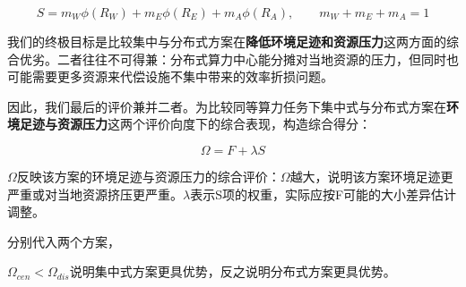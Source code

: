 \begin{equation}\label{eq:q2-sweighted}
S=m_W\phi(R_W)+m_E\phi(R_E)+m_A\phi(R_A), \qquad m_W+m_E+m_A=1
\end{equation}


我们的终极目标是比较集中与分布式方案在\textbf{降低环境足迹和资源压力}这两方面的综合优劣。二者往往不可得兼：分布式算力中心能分摊对当地资源的压力，但同时也可能需要更多资源来代偿设施不集中带来的效率折损问题。

因此，我们最后的评价兼并二者。为比较同等算力任务下集中式与分布式方案在\textbf{环境足迹与资源压力}这两个评价向度下的综合表现，构造综合得分：

\begin{equation}\label{eq:q2-final}
\Omega = F + \lambda S
\end{equation}

$\Omega$反映该方案的环境足迹与资源压力的综合评价：$\Omega$越大，说明该方案环境足迹更严重或对当地资源挤压更严重。$\lambda$表示S项的权重，实际应按F可能的大小差异估计调整。

分别代入两个方案，

$\Omega_{cen}<\Omega_{dis}$说明集中式方案更具优势，反之说明分布式方案更具优势。

